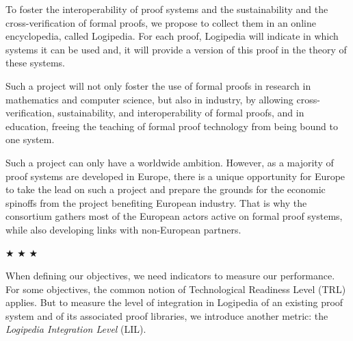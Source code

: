 To foster the interoperability of proof systems and the sustainability
and the cross-verification of formal proofs, we propose to collect
them in an online encyclopedia, called Logipedia.  For each proof,
Logipedia will indicate in which systems it can be used and, it will
provide a version of this proof in the theory of these systems.

Such a project will not only foster the use of formal proofs in
research in mathematics and computer science, but also in industry, by
allowing cross-verification, sustainability, and interoperability of
formal proofs, and in education, freeing the teaching of formal proof
technology from being bound to one system.

Such a project can only have a worldwide ambition. However, as a
majority of proof systems are developed in Europe, there is a unique
opportunity for Europe to take the lead on such a project and prepare
the grounds for the economic spinoffs from the project benefiting
European industry. That is why the consortium gathers most of the
European actors active on formal proof systems, while also developing
links with non-European partners.

\begin{center}
  
$\bigstar$ $\bigstar$ $\bigstar$

\end{center}

When defining our objectives, we need indicators to measure our
performance. For some objectives, the common notion of Technological
Readiness Level (TRL) applies. But to measure the level of integration in Logipedia of an
existing proof system and of its associated proof libraries, we
introduce another metric: the {\em Logipedia Integration
  Level} (LIL).

